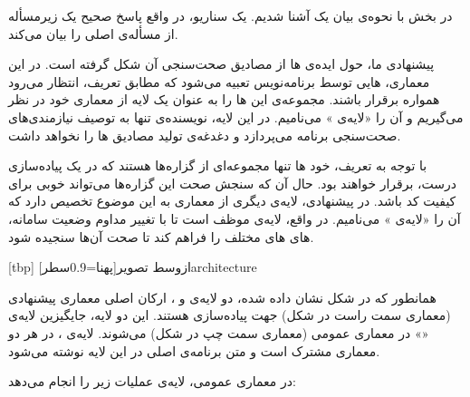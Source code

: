 در بخش  با نحوه‌ی بیان یک  آشنا شدیم. یک سناریو، در واقع پاسخ صحیح یک زیرمسأله از مسأله‌ی اصلی را بیان می‌کند.

 پیشنهادی ما، حول ایده‌ی  ‌ها از مصادیق صحت‌سنجی آن شکل گرفته است. در این معماری، ‌هایی توسط برنامه‌نویس تعبیه می‌شود که مطابق تعریف، انتظار می‌رود همواره برقرار باشند. مجموعه‌ی این ‌ها را به عنوان یک لایه از معماری   خود در نظر می‌گیریم و آن را «لایه‌ی » می‌نامیم. در این لایه، نویسنده‌ی  تنها به توصیف نیازمندی‌های صحت‌سنجی برنامه می‌پردازد و دغدغه‌ی تولید مصادیق ‌ها را نخواهد داشت.

با توجه به تعریف، خود ‌ها تنها مجموعه‌ای از گزاره‌ها هستند که در یک پیاده‌سازی درست، برقرار خواهند بود. حال آن که سنجش صحت این گزاره‌ها می‌تواند  خوبی برای کیفیت کد باشد. در  پیشنهادی، لایه‌ی دیگری از معماری  به این موضوع تخصیص دارد که آن را «لایه‌ی » می‌نامیم. در واقع، لایه‌ی  موظف است تا با تغییر مداوم وضعیت سامانه، ‌های ‌های مختلف را فراهم کند تا صحت آن‌ها سنجیده شود.

[tbp]
‌ازوسط
‌تصویر[پهنا=0.9‌سطر]{architecture}

همانطور که در شکل  نشان داده شده، دو لایه‌ی
 و ، ارکان اصلی معماری پیشنهادی (معماری سمت
راست در شکل) جهت پیاده‌سازی   هستند. این دو
لایه، جایگیزین لایه‌ی «» در معماری عمومی (معماری سمت چپ در
شکل) می‌شوند. لایه‌ی ، در هر دو معماری مشترک
است و متن برنامه‌ی اصلی در این لایه نوشته می‌شود.

در معماری عمومی، لایه‌ی  عملیات زیر را انجام می‌دهد:




